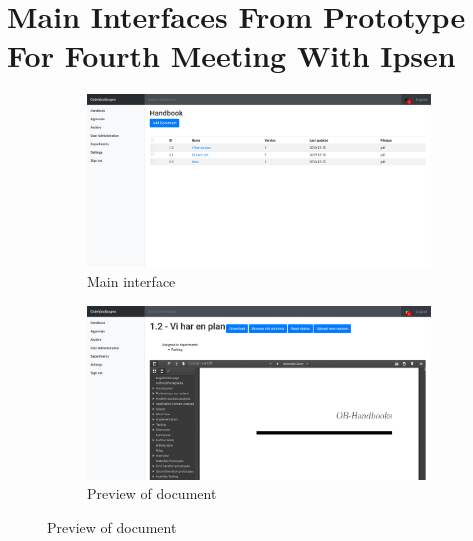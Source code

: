 \section{Main Interfaces From Prototype For Fourth Meeting With Ipsen}\label{sec:2prototype}
\begin{figure}[H]
	\centering
	\begin{subfigure}[b]{0.48\textwidth}
		\includegraphics[width=\textwidth]{billeder/iteration2Prototyper/main.png}
		\caption{Main interface}
		\label{fig:4-MainAdmin}
	\end{subfigure}
	\quad
	\begin{subfigure}[b]{0.48\textwidth}
		\includegraphics[width=\textwidth]{billeder/iteration2Prototyper/Preview.png}
		\caption{Preview of document}
		\label{fig:4-DocPreview}
	\end{subfigure}
\end{figure}

